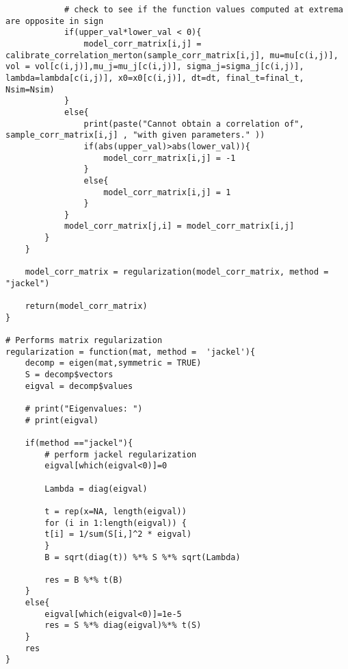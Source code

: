 \begin{lstlisting}
			# check to see if the function values computed at extrema are opposite in sign
			if(upper_val*lower_val < 0){
				model_corr_matrix[i,j] =  calibrate_correlation_merton(sample_corr_matrix[i,j], mu=mu[c(i,j)], vol = vol[c(i,j)],mu_j=mu_j[c(i,j)], sigma_j=sigma_j[c(i,j)], lambda=lambda[c(i,j)], x0=x0[c(i,j)], dt=dt, final_t=final_t, Nsim=Nsim)
			}
			else{
				print(paste("Cannot obtain a correlation of", sample_corr_matrix[i,j] , "with given parameters." ))
				if(abs(upper_val)>abs(lower_val)){
					model_corr_matrix[i,j] = -1
				}
				else{
					model_corr_matrix[i,j] = 1
				}
			}
			model_corr_matrix[j,i] = model_corr_matrix[i,j]
		}
	}
	
	model_corr_matrix = regularization(model_corr_matrix, method = "jackel")
	
	return(model_corr_matrix)
}

# Performs matrix regularization
regularization = function(mat, method =  'jackel'){
	decomp = eigen(mat,symmetric = TRUE)
	S = decomp$vectors
	eigval = decomp$values
	
	# print("Eigenvalues: ")
	# print(eigval)
	
	if(method =="jackel"){
		# perform jackel regularization
		eigval[which(eigval<0)]=0
	
		Lambda = diag(eigval)
	
		t = rep(x=NA, length(eigval))
		for (i in 1:length(eigval)) {
		t[i] = 1/sum(S[i,]^2 * eigval)
		}  
		B = sqrt(diag(t)) %*% S %*% sqrt(Lambda)
	
		res = B %*% t(B)
	}
	else{
		eigval[which(eigval<0)]=1e-5
		res = S %*% diag(eigval)%*% t(S)
	}
	res
}
\end{lstlisting}

